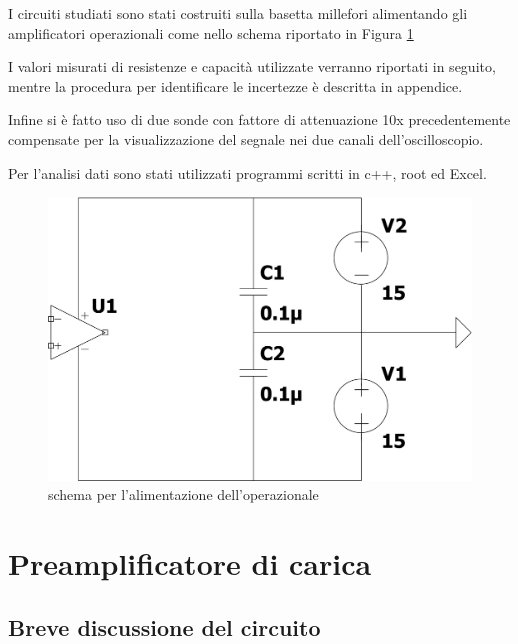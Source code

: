 \documentclass{article}
\begin{document}
I circuiti studiati sono stati costruiti sulla basetta millefori alimentando gli amplificatori operazionali come nello schema riportato 
in Figura \ref{fig:alimentazione}

I valori misurati di resistenze e capacità utilizzate verranno riportati in seguito, mentre la procedura per identificare le incertezze
è descritta in appendice.

Infine si è fatto uso di due sonde con fattore di attenuazione 10x precedentemente compensate per la visualizzazione del 
segnale nei due canali dell'oscilloscopio.

Per l'analisi dati sono stati utilizzati programmi scritti in c++, root ed Excel.

\begin{center}
\begin{figure}[ht]
\centering
\includegraphics[scale=0.28, angle=0]{alimentazione.pdf}
\caption{ schema per l'alimentazione dell'operazionale }
\label{fig:alimentazione}
\end{figure}
\end{center} 

\section{Preamplificatore di carica}

\subsection{Breve discussione del circuito}
\end{document}
